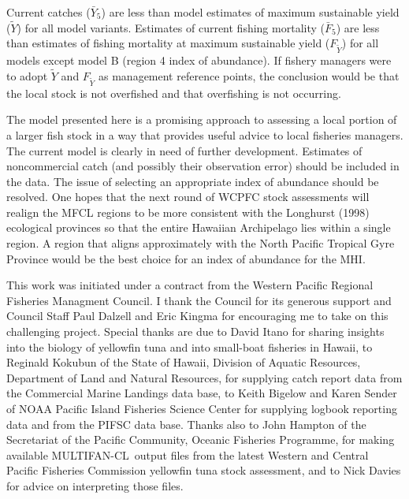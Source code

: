 \documentclass[12pt,letterpaper]{article}
\newcommand\singlespacing{\baselineskip=1.0\normalbaselineskip}
\newcommand\MFCL{MULTIFAN-CL}
\newcommand\MSY{\widetilde{Y}}
\newcommand\Fmsy{F_{\MSY}}
\begin{document}
Current catches ($\bar{Y}_5$) are less than model estimates of maximum
sustainable yield ($\MSY$) for all model variants. 
Estimates of current fishing mortality ($\bar{F}_5$) are less than
estimates of fishing mortality at maximum sustainable yield ($\Fmsy$)
for all models except model B (region 4 index of abundance).
If fishery managers were to adopt $\MSY$ and $\Fmsy$ as management
reference points, the conclusion would be that the local stock is not
overfished and that overfishing is not occurring.

The model presented here is a promising approach to assessing a local
portion of a larger fish stock in a way that provides useful advice to
local fisheries managers. The current model is clearly in need of
further development. Estimates of noncommercial catch (and possibly
their observation error) should be included in the data. 
The issue of selecting an appropriate index of abundance should be
resolved. One hopes that the
next round of  WCPFC stock assessments will realign
the MFCL regions to be more consistent
with the Longhurst (1998) ecological provinces so that the entire
Hawaiian Archipelago lies within a single region. 
A region that aligns approximately with  the North Pacific Tropical
Gyre Province would be the best choice for an index of abundance for
the MHI.



\clearpage
\singlespacing
{}
This work was initiated under a contract from the Western Pacific
Regional Fisheries Managment Council. 
I thank the Council for its generous support and
Council Staff Paul Dalzell and Eric Kingma for encouraging me to
take on this challenging project.
Special thanks are due 
to David Itano for sharing insights into the biology of yellowfin tuna
and into small-boat fisheries in Hawaii,
to Reginald Kokubun of the State of Hawaii, Division of Aquatic Resources,
Department of Land and Natural Resources, for supplying catch report
data from the Commercial Marine Landings data base,
to Keith Bigelow and Karen Sender of NOAA Pacific
Island Fisheries Science Center for supplying logbook reporting data and
from the PIFSC data base.
Thanks also to John Hampton of the Secretariat of the Pacific
Community, Oceanic Fisheries Programme, for making available \MFCL\
output files from the latest Western and Central Pacific
Fisheries Commission yellowfin tuna stock assessment, and to Nick
Davies for advice on interpreting those files.
\end{document}
